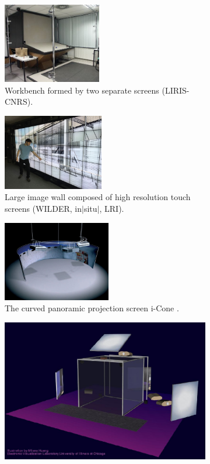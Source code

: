 \begin{figure}[htb]
  \begin{subfigure}{.3\textwidth}
    \centering
    \includegraphics[height=3.5cm]{figures/ch1/workbench}
    \caption{Workbench formed by two separate screens (LIRIS-CNRS).}
    \label{fig:1_vi:bench}
  \end{subfigure}
  \begin{subfigure}{.3\textwidth}
    \centering
    \includegraphics[height=3.3cm]{figures/ch1/wilder}
    \caption{Large image wall composed of high resolution touch screens (WILDER, in$\lvert$situ$\rvert$, LRI).}
    \label{fig:1_vi:wall}
  \end{subfigure}
  \begin{subfigure}{.3\textwidth}
    \centering
    \includegraphics[height=3.5cm]{figures/ch1/icone}
    \caption{The curved panoramic projection screen i-Cone\texttrademark{} \citep{Simon2002Icone}.}
    \label{fig:1_vi:icone}
  \end{subfigure}
  \begin{subfigure}{.5\textwidth}
    \centering
    \includegraphics[width=0.9\linewidth]{figures/ch1/cave}

\end{subfigure}
\end{figure}
